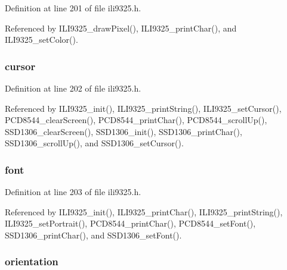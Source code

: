 Definition at line 201 of file ili9325.\-h.



Referenced by I\-L\-I9325\-\_\-draw\-Pixel(), I\-L\-I9325\-\_\-print\-Char(), and I\-L\-I9325\-\_\-set\-Color().

\hypertarget{structlcd__t_a2465b2093554ecfe6a0b8a274e17a083}{
\subsubsection[{cursor}]{ cursor}}\label{structlcd__t_a2465b2093554ecfe6a0b8a274e17a083}


Definition at line 202 of file ili9325.\-h.



Referenced by I\-L\-I9325\-\_\-init(), I\-L\-I9325\-\_\-print\-String(), I\-L\-I9325\-\_\-set\-Cursor(), P\-C\-D8544\-\_\-clear\-Screen(), P\-C\-D8544\-\_\-print\-Char(), P\-C\-D8544\-\_\-scroll\-Up(), S\-S\-D1306\-\_\-clear\-Screen(), S\-S\-D1306\-\_\-init(), S\-S\-D1306\-\_\-print\-Char(), S\-S\-D1306\-\_\-scroll\-Up(), and S\-S\-D1306\-\_\-set\-Cursor().

\hypertarget{structlcd__t_a2efb3d8aba13baee6ea9250b1075454a}{
\subsubsection[{font}]{ font}}\label{structlcd__t_a2efb3d8aba13baee6ea9250b1075454a}


Definition at line 203 of file ili9325.\-h.



Referenced by I\-L\-I9325\-\_\-init(), I\-L\-I9325\-\_\-print\-Char(), I\-L\-I9325\-\_\-print\-String(), I\-L\-I9325\-\_\-set\-Portrait(), P\-C\-D8544\-\_\-print\-Char(), P\-C\-D8544\-\_\-set\-Font(), S\-S\-D1306\-\_\-print\-Char(), and S\-S\-D1306\-\_\-set\-Font().

\hypertarget{structlcd__t_a6d94b70b32de86c41ac93f2e2cc21093}{
\subsubsection[{orientation}]{ orientation}}\label{structlcd__t_a6d94b70b32de86c41ac93f2e2cc21093}


